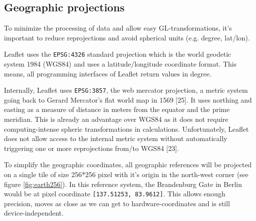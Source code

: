     \subsection{Geographic projections}
      To minimize the processing of data and allow easy GL-transformations, it's important to reduce reprojections and avoid spherical units (e.g. degree, lat/lon).\par
      Leaflet uses the \texttt{EPSG:4326} standard projection which is the world geodetic system 1984 (WGS84) and uses a latitude/longitude coordinate format. This means, all programming interfaces of Leaflet return values in degree.\par
      Internally, Leaflet uses \texttt{EPSG:3857}, the web mercator projection, a metric system going back to Gerard Mercator's flat world map in 1569 [25]. It uses northing and easting as a measure of distance in meters from the equator and the prime meridian. This is already an advantage over WGS84 as it does not require computing-intense spheric transformations in calculations. Unfortunately, Leaflet does not allow access to the internal metric system without automatically triggering one or more reprojections from/to WGS84 [23].\par


      To simplify the geographic coordinates, all geographic references will be projected on a single tile of size 256*256 pixel with it's origin in the north-west corner (see figure \ref{fig:earth256}). In this reference system, the Brandenburg Gate in Berlin would be at pixel coordinate \texttt{[137.51253, 83.9612]}. This allows enough precision, moves as close as we can get to hardware-coordinates and is still device-independent.\par

